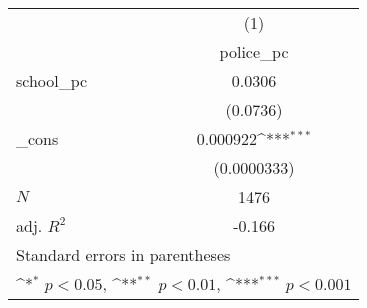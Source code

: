 {
\def\sym#1{\ifmmode^{#1}\else\(^{#1}\)\fi}
\begin{tabular}{l*{1}{c}}
\hline\hline
            &\multicolumn{1}{c}{(1)}\\
            &\multicolumn{1}{c}{police\_pc}\\
\hline
school\_pc   &      0.0306         \\
            &    (0.0736)         \\
[1em]
\_cons      &    0.000922\sym{***}\\
            & (0.0000333)         \\
\hline
\(N\)       &        1476         \\
adj. \(R^{2}\)&      -0.166         \\
\hline\hline
\multicolumn{2}{l}{\footnotesize Standard errors in parentheses}\\
\multicolumn{2}{l}{\footnotesize \sym{*} \(p<0.05\), \sym{**} \(p<0.01\), \sym{***} \(p<0.001\)}\\
\end{tabular}
}
